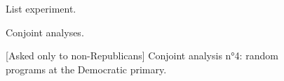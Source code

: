 \begin{figure}[h!]
    \caption{List experiment.}\label{fig:list_exp}
\end{figure}

\begin{figure}[h!]
    \caption{Conjoint analyses.}\label{fig:conjoint}
\end{figure}

\begin{figure}[h!] %
    \caption{[Asked only to non-Republicans] Conjoint analysis n°4: random programs at the Democratic primary.}\label{fig:ca_r}
\end{figure}


